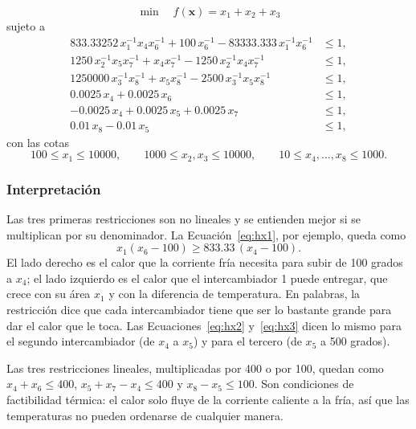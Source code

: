\begin{equation}
\min \quad f(\mathbf{x}) = x_1 + x_2 + x_3
\end{equation}
sujeto a
\begin{align}
833.33252\,x_1^{-1} x_4 x_6^{-1} + 100\,x_6^{-1} - 83333.333\,x_1^{-1} x_6^{-1} &\le 1, \label{eq:hx1}\\
1250\,x_2^{-1} x_5 x_7^{-1} + x_4 x_7^{-1} - 1250\,x_2^{-1} x_4 x_7^{-1} &\le 1, \label{eq:hx2}\\
1250000\,x_3^{-1} x_8^{-1} + x_5 x_8^{-1} - 2500\,x_3^{-1} x_5 x_8^{-1} &\le 1, \label{eq:hx3}\\
0.0025\,x_4 + 0.0025\,x_6 &\le 1, \label{eq:hx4}\\
-0.0025\,x_4 + 0.0025\,x_5 + 0.0025\,x_7 &\le 1, \label{eq:hx5}\\
0.01\,x_8 - 0.01\,x_5 &\le 1, \label{eq:hx6}
\end{align}
con las cotas
\begin{equation}
100 \le x_1 \le 10000, \qquad 1000 \le x_2, x_3 \le 10000, \qquad 10 \le x_4, \dots, x_8 \le 1000.
\end{equation}

\subsubsection{Interpretación}

Las tres primeras restricciones son no lineales y se entienden mejor si se multiplican por su denominador. La Ecuación~\eqref{eq:hx1}, por ejemplo, queda como
\begin{equation}
x_1 (x_6 - 100) \ge 833.33\,(x_4 - 100).
\end{equation}
El lado derecho es el calor que la corriente fría necesita para subir de 100 grados a $x_4$; el lado izquierdo es el calor que el intercambiador 1 puede entregar, que crece con su área $x_1$ y con la diferencia de temperatura. En palabras, la restricción dice que cada intercambiador tiene que ser lo bastante grande para dar el calor que le toca. Las Ecuaciones~\eqref{eq:hx2} y~\eqref{eq:hx3} dicen lo mismo para el segundo intercambiador (de $x_4$ a $x_5$) y para el tercero (de $x_5$ a 500 grados).

Las tres restricciones lineales, multiplicadas por 400 o por 100, quedan como $x_4 + x_6 \le 400$, $x_5 + x_7 - x_4 \le 400$ y $x_8 - x_5 \le 100$. Son condiciones de factibilidad térmica: el calor solo fluye de la corriente caliente a la fría, así que las temperaturas no pueden ordenarse de cualquier manera.

